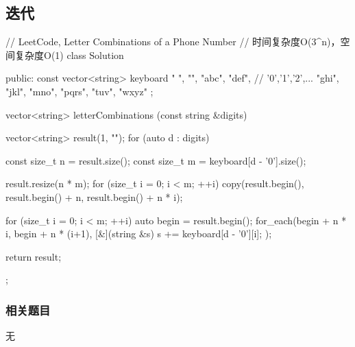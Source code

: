 \subsection{迭代}
\begin{Code}
	// LeetCode, Letter Combinations of a Phone Number
	// 时间复杂度O(3^n)，空间复杂度O(1)
	class Solution {
		public:
		const vector<string> keyboard { " ", "", "abc", "def", // '0','1','2',...
			"ghi", "jkl", "mno", "pqrs", "tuv", "wxyz" };
		
		vector<string> letterCombinations (const string &digits) {
			vector<string> result(1, "");
			for (auto d : digits) {
				const size_t n = result.size();
				const size_t m = keyboard[d - '0'].size();
				
				result.resize(n * m);
				for (size_t i = 0; i < m; ++i)
				copy(result.begin(), result.begin() + n, result.begin() + n * i);
				
				for (size_t i = 0; i < m; ++i) {
					auto begin = result.begin();
					for_each(begin + n * i, begin + n * (i+1), [&](string &s) {
						s += keyboard[d - '0'][i];
					});
				}
			}
			return result;
		}
	};
\end{Code}


\subsubsection{相关题目}
\begindot
\item 无
\myenddot
